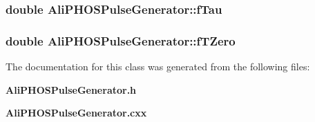 \subsubsection{\setlength{\rightskip}{0pt plus 5cm}double {\bf Ali\-PHOSPulse\-Generator::f\-Tau}\hspace{0.3cm}{\tt  [private]}}\label{classAliPHOSPulseGenerator_r2}


\subsubsection{\setlength{\rightskip}{0pt plus 5cm}double {\bf Ali\-PHOSPulse\-Generator::f\-TZero}\hspace{0.3cm}{\tt  [private]}}\label{classAliPHOSPulseGenerator_r4}




The documentation for this class was generated from the following files:\begin{CompactItemize}
\item 
{\bf Ali\-PHOSPulse\-Generator.h}\item 
{\bf Ali\-PHOSPulse\-Generator.cxx}\end{CompactItemize}
